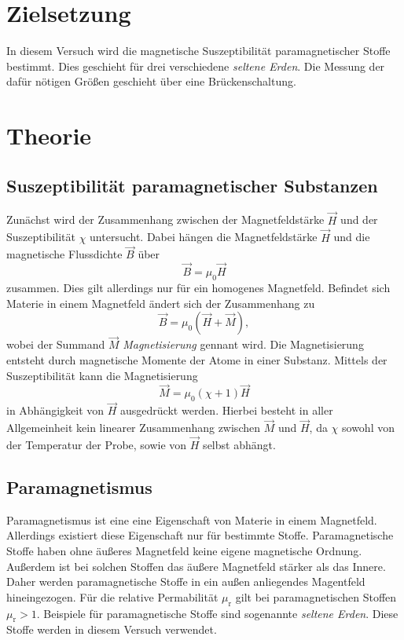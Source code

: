 \section{Zielsetzung}
\label{sec:ziel}
In diesem Versuch wird die magnetische Suszeptibilität paramagnetischer Stoffe bestimmt. Dies geschieht für drei verschiedene \textit{seltene Erden}. Die Messung der dafür nötigen
Größen geschieht über eine Brückenschaltung.

\section{Theorie}
\label{sec:Theorie}

\subsection{Suszeptibilität paramagnetischer Substanzen}
\label{subsec:Berechnung}

Zunächst wird der Zusammenhang zwischen der Magnetfeldstärke $\vec{H}$ und der Suszeptibilität $\chi$ untersucht. Dabei hängen die Magnetfeldstärke $\vec{H}$ und 
die magnetische Flussdichte $\vec{B}$ über 
\begin{equation*}
    \vec{B} = \mu_0 \vec{H}
\end{equation*}
zusammen. Dies gilt allerdings nur für ein homogenes Magnetfeld. Befindet sich Materie in einem Magnetfeld ändert sich der Zusammenhang zu
\begin{equation}
    \label{eqn:magnetfeld}
    \vec{B} = \mu_0 \left(\vec{H} + \vec{M}\right),
\end{equation}
wobei der Summand $\vec{M}$ \textit{Magnetisierung} gennant wird. 
Die Magnetisierung entsteht durch magnetische Momente der Atome in einer Substanz. Mittels der Suszeptibilität kann die Magnetisierung
\begin{equation}
    \label{eqn:Mchi}
    \vec{M} = \mu_0 (\chi+1) \vec{H}
\end{equation}
in Abhängigkeit von $\vec{H}$ ausgedrückt werden. 
Hierbei besteht in aller Allgemeinheit kein linearer Zusammenhang zwischen $\vec{M}$ und $\vec{H}$, da $\chi$ sowohl von der Temperatur der Probe, sowie von $\vec{H}$ selbst abhängt.

\subsection{Paramagnetismus}
\label{subsec:paramagnetismus}
Paramagnetismus ist eine eine Eigenschaft von Materie in einem Magnetfeld. Allerdings existiert diese Eigenschaft nur für bestimmte Stoffe. Paramagnetische Stoffe haben ohne 
äußeres Magnetfeld keine eigene magnetische Ordnung. Außerdem ist bei solchen Stoffen das äußere Magnetfeld stärker als das Innere. Daher werden paramagnetische Stoffe in ein
außen anliegendes Magentfeld hineingezogen. Für die relative Permabilität $\mu_{\text{r}}$ gilt bei paramagnetischen Stoffen $ \mu_\text{r} > 1 $. Beispiele für paramagnetische 
Stoffe sind sogenannte \textit{seltene Erden}. Diese Stoffe werden in diesem Versuch verwendet. 

